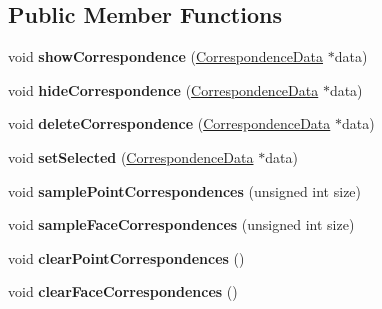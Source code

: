 \subsection*{Public Member Functions}
\begin{DoxyCompactItemize}
\item 
\hypertarget{class_shape_analyzer_a5395b2f99a8b319aa1253b1f78441227}{}void {\bfseries show\+Correspondence} (\hyperlink{class_correspondence_data}{Correspondence\+Data} $\ast$data)\label{class_shape_analyzer_a5395b2f99a8b319aa1253b1f78441227}

\item 
\hypertarget{class_shape_analyzer_a57f15af0c9408e7f81254b0b6b354282}{}void {\bfseries hide\+Correspondence} (\hyperlink{class_correspondence_data}{Correspondence\+Data} $\ast$data)\label{class_shape_analyzer_a57f15af0c9408e7f81254b0b6b354282}

\item 
\hypertarget{class_shape_analyzer_aef90f693092ea6d46d3543e1770e095b}{}void {\bfseries delete\+Correspondence} (\hyperlink{class_correspondence_data}{Correspondence\+Data} $\ast$data)\label{class_shape_analyzer_aef90f693092ea6d46d3543e1770e095b}

\item 
\hypertarget{class_shape_analyzer_acf67cbc53e62cca5b65a230d88708902}{}void {\bfseries set\+Selected} (\hyperlink{class_correspondence_data}{Correspondence\+Data} $\ast$data)\label{class_shape_analyzer_acf67cbc53e62cca5b65a230d88708902}

\item 
\hypertarget{class_shape_analyzer_ab1c47303779d1b08bb1a1df5d6ec3662}{}void {\bfseries sample\+Point\+Correspondences} (unsigned int size)\label{class_shape_analyzer_ab1c47303779d1b08bb1a1df5d6ec3662}

\item 
\hypertarget{class_shape_analyzer_a9eaddb1463e34e7d451148823d1687ef}{}void {\bfseries sample\+Face\+Correspondences} (unsigned int size)\label{class_shape_analyzer_a9eaddb1463e34e7d451148823d1687ef}

\item 
\hypertarget{class_shape_analyzer_aa23b5c23bbe066fc5a9903e73e507b22}{}void {\bfseries clear\+Point\+Correspondences} ()\label{class_shape_analyzer_aa23b5c23bbe066fc5a9903e73e507b22}

\item 
\hypertarget{class_shape_analyzer_a2e5a2284dd96c95e6cb34ce7ce61d3e9}{}void {\bfseries clear\+Face\+Correspondences} ()\label{class_shape_analyzer_a2e5a2284dd96c95e6cb34ce7ce61d3e9}


\end{DoxyCompactItemize}
